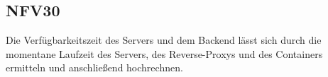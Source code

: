 \subsection*{NFV30}

Die Verfügbarkeitszeit des Servers und dem Backend lässt sich durch die momentane Laufzeit des Servers,
des Reverse-Proxys und des Containers ermitteln und anschließend hochrechnen.